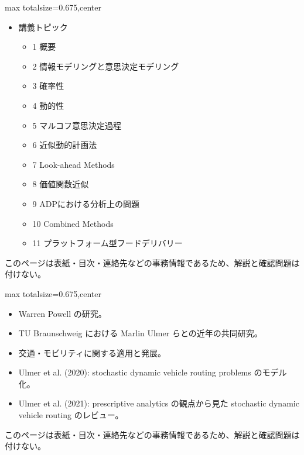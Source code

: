 \clearpage
{}
\begin{adjustbox}{max totalsize={\textwidth}{0.675\textheight},center}
\begin{minipage}{\textwidth}\scriptsize
\begin{minipage}[t]{0.485\textwidth}
\begin{itemize}
\item 講義トピック
\begin{itemize}
\item 1 概要
\item 2 情報モデリングと意思決定モデリング
\item 3 確率性
\item 4 動的性
\item 5 マルコフ意思決定過程
\item 6 近似動的計画法
\item 7 Look-ahead Methods
\item 8 価値関数近似
\item 9 ADPにおける分析上の問題
\item 10 Combined Methods
\item 11 プラットフォーム型フードデリバリー
\end{itemize}
\end{itemize}
\end{minipage}\hfill
\begin{minipage}[t]{0.485\textwidth}
{\small このページは表紙・目次・連絡先などの事務情報であるため、解説と確認問題は付けない。}
\end{minipage}
\end{minipage}
\end{adjustbox}

\clearpage
{}
\begin{adjustbox}{max totalsize={\textwidth}{0.675\textheight},center}
\begin{minipage}{\textwidth}\scriptsize
\begin{minipage}[t]{0.485\textwidth}
\begin{itemize}
\item Warren Powell の研究。
\item TU Braunschweig における Marlin Ulmer らとの近年の共同研究。
\item 交通・モビリティに関する適用と発展。
\item Ulmer et al. (2020): stochastic dynamic vehicle routing problems のモデル化。
\item Ulmer et al. (2021): prescriptive analytics の観点から見た stochastic dynamic vehicle routing のレビュー。
\end{itemize}
\end{minipage}\hfill
\begin{minipage}[t]{0.485\textwidth}
{\small このページは表紙・目次・連絡先などの事務情報であるため、解説と確認問題は付けない。}
\end{minipage}
\end{minipage}
\end{adjustbox}


